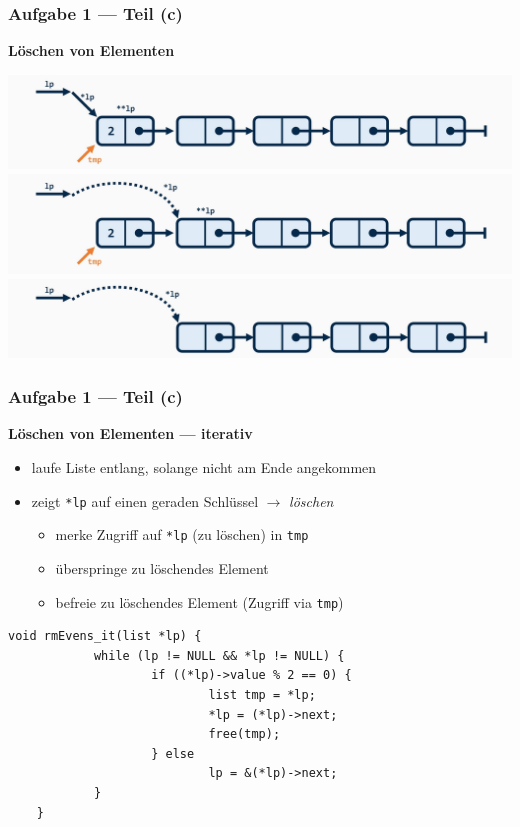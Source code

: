 \documentclass{beamer}
\newcommand*{\ttfamilywithbold}{\fontfamily{lmtt}\selectfont}
\begin{document}
\begin{frame}[fragile] \frametitle{Aufgabe 1 --- Teil (c)}
	\textbf{Löschen von Elementen}
	\begin{center}
		\includegraphics[width=\linewidth]{tut06-graphics/tut06-rmEvans-1} \\ \pause
		\includegraphics[width=\linewidth]{tut06-graphics/tut06-rmEvans-2} \\ \pause
		\includegraphics[width=\linewidth]{tut06-graphics/tut06-rmEvans-3}
	\end{center}
\end{frame}


\begin{frame}[fragile] \frametitle{Aufgabe 1 --- Teil (c)}
	\textbf{Löschen von Elementen --- iterativ}
	\begin{itemize}
		\item laufe Liste entlang, solange nicht am Ende angekommen
		\item zeigt \texttt{*lp} auf einen geraden Schlüssel $\to$  \textit{löschen}
		\begin{itemize}
			\item merke Zugriff auf \texttt{*lp} (zu löschen) in \texttt{tmp}
			\item überspringe zu löschendes Element
			\item befreie zu löschendes Element (Zugriff via \texttt{tmp})
		\end{itemize}
	\end{itemize}
	
	\pause
	
	\begin{lstlisting}[style=notebook, basicstyle=\scriptsize\ttfamilywithbold]
	void rmEvens_it(list *lp) {
			while (lp != NULL && *lp != NULL) {
					if ((*lp)->value % 2 == 0) {
							list tmp = *lp;
							*lp = (*lp)->next;
							free(tmp);
					} else
							lp = &(*lp)->next;
			}
	}
	\end{lstlisting}
\end{frame}
\end{document}

